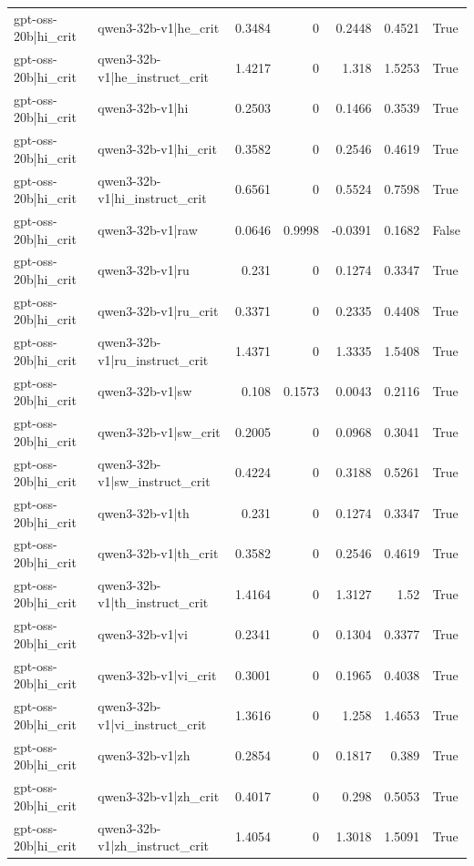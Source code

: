 \begin{table}
\begin{tabular}{l l r r r r l}
gpt-oss-20b|hi_crit & qwen3-32b-v1|he_crit & 0.3484 & 0 & 0.2448 & 0.4521 & True \\
gpt-oss-20b|hi_crit & qwen3-32b-v1|he_instruct_crit & 1.4217 & 0 & 1.318 & 1.5253 & True \\
gpt-oss-20b|hi_crit & qwen3-32b-v1|hi & 0.2503 & 0 & 0.1466 & 0.3539 & True \\
gpt-oss-20b|hi_crit & qwen3-32b-v1|hi_crit & 0.3582 & 0 & 0.2546 & 0.4619 & True \\
gpt-oss-20b|hi_crit & qwen3-32b-v1|hi_instruct_crit & 0.6561 & 0 & 0.5524 & 0.7598 & True \\
gpt-oss-20b|hi_crit & qwen3-32b-v1|raw & 0.0646 & 0.9998 & -0.0391 & 0.1682 & False \\
gpt-oss-20b|hi_crit & qwen3-32b-v1|ru & 0.231 & 0 & 0.1274 & 0.3347 & True \\
gpt-oss-20b|hi_crit & qwen3-32b-v1|ru_crit & 0.3371 & 0 & 0.2335 & 0.4408 & True \\
gpt-oss-20b|hi_crit & qwen3-32b-v1|ru_instruct_crit & 1.4371 & 0 & 1.3335 & 1.5408 & True \\
gpt-oss-20b|hi_crit & qwen3-32b-v1|sw & 0.108 & 0.1573 & 0.0043 & 0.2116 & True \\
gpt-oss-20b|hi_crit & qwen3-32b-v1|sw_crit & 0.2005 & 0 & 0.0968 & 0.3041 & True \\
gpt-oss-20b|hi_crit & qwen3-32b-v1|sw_instruct_crit & 0.4224 & 0 & 0.3188 & 0.5261 & True \\
gpt-oss-20b|hi_crit & qwen3-32b-v1|th & 0.231 & 0 & 0.1274 & 0.3347 & True \\
gpt-oss-20b|hi_crit & qwen3-32b-v1|th_crit & 0.3582 & 0 & 0.2546 & 0.4619 & True \\
gpt-oss-20b|hi_crit & qwen3-32b-v1|th_instruct_crit & 1.4164 & 0 & 1.3127 & 1.52 & True \\
gpt-oss-20b|hi_crit & qwen3-32b-v1|vi & 0.2341 & 0 & 0.1304 & 0.3377 & True \\
gpt-oss-20b|hi_crit & qwen3-32b-v1|vi_crit & 0.3001 & 0 & 0.1965 & 0.4038 & True \\
gpt-oss-20b|hi_crit & qwen3-32b-v1|vi_instruct_crit & 1.3616 & 0 & 1.258 & 1.4653 & True \\
gpt-oss-20b|hi_crit & qwen3-32b-v1|zh & 0.2854 & 0 & 0.1817 & 0.389 & True \\
gpt-oss-20b|hi_crit & qwen3-32b-v1|zh_crit & 0.4017 & 0 & 0.298 & 0.5053 & True \\
gpt-oss-20b|hi_crit & qwen3-32b-v1|zh_instruct_crit & 1.4054 & 0 & 1.3018 & 1.5091 & True \\

\end{tabular}
\end{table}
